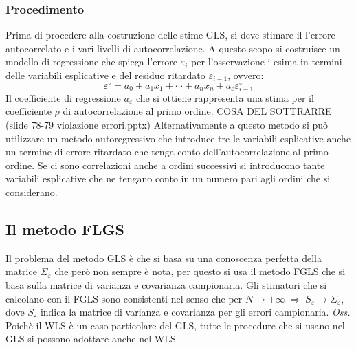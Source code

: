 \subsubsection{Procedimento}
Prima di procedere alla costruzione delle stime GLS,  si deve stimare il l'errore autocorrelato e i vari livelli di autocorrelazione. A questo scopo si costruisce un modello di regressione che spiega l'errore $\varepsilon_i$ per l'osservazione i-esima in termini delle variabili esplicative e del residuo ritardato $\varepsilon_{i-1}$, ovvero:
\begin{equation}
\varepsilon^\circ = a_0 + a_1x_1 + \cdots + a_n x_n + a_\varepsilon \varepsilon_{i-1}^\circ
\end{equation}
Il coefficiente di regressione $a_\varepsilon$ che si ottiene rappresenta una stima per il coefficiente $\rho$ di autocorrelazione al primo ordine.
COSA DEL SOTTRARRE (slide 78-79 violazione errori.pptx)
Alternativamente a questo metodo si può utilizzare un metodo autoregressivo che introduce tre le variabili esplicative anche un termine di errore ritardato che tenga conto dell'autocorrelazione al primo ordine. Se ci sono correlazioni anche a ordini successivi si introducono tante variabili esplicative che ne tengano conto in un numero pari agli ordini che si considerano.
\subsection{Il metodo FLGS}
Il problema del metodo GLS è che si basa su una conoscenza perfetta della matrice $\Sigma_\varepsilon$ che però non sempre è nota, per questo si usa il metodo FGLS che si basa sulla matrice di varianza e covarianza campionaria. Gli stimatori che si calcolano con il FGLS sono consistenti nel senso che per $N \rightarrow +\infty \; \Rightarrow \; S_\varepsilon \rightarrow \Sigma_\varepsilon$, dove $S_\varepsilon$ indica la matrice di varianza e covarianza per gli errori campionaria.
\textit{Oss.}\\
Poichè il WLS è un caso particolare del GLS, tutte le procedure che si usano nel GLS si possono adottare anche nel WLS. 


